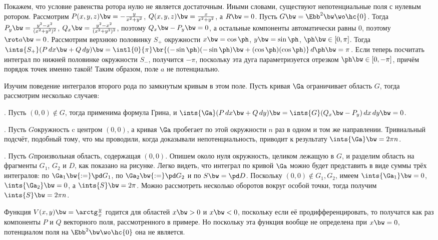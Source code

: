 \documentclass[a4paper]{article}
\begin{document}
\begin{ex}
Покажем, что условие равенства ротора нулю не является достаточным. Иными словами, существуют непотенциальные
поля с нулевым ротором. Рассмотрим $P(x,y,z) \bw= -\frac{y}{x^2+y^2}$, $Q(x,y,z) \bw= \frac{x}{x^2+y^2}$, а
$R \bw= 0$. Пусть $G \bw= \Ebb^2\bw\wo \hc{0}$. Тогда $P_y\bw=\frac{y^2-x^2}{(x^2+y^2)^2}$,
$Q_x\bw=\frac{y^2-x^2}{(x^2+y^2)^2}$, поэтому $Q_x\bw-P_y \bw= 0$, а остальные компоненты автоматически равны
$0$, поэтому $\rot a \bw= 0$. Рассмотрим верхнюю половинку $S_+$ окружности $x \bw= \cos \ph$, $y \bw= \sin
\ph$, $\ph \bw\in [0,\pi]$. Тогда $\ints{S_+}(P\,d x \bw+ Q\,d y) \bw= \intl{0}{\pi}\br{(-\sin\ph)(-\sin\ph)
\bw+ (\cos\ph)(\cos\ph)}\,d \ph \bw= \pi$. Если теперь посчитать интеграл по нижней половинке окружности
$S_-$, получится $-\pi$, поскольку эта дуга параметризуется отрезком $\ph \bw\in [0,-\pi]$, причём порядок
точек именно такой! Таким образом, поле $a$ не потенциально.

Изучим поведение интегралов второго рода по замкнутым кривым в этом поле. Пусть кривая $\Ga$ ограничивает область $G$,
тогда рассмотрим несколько случаев:

. Пусть $(0,0)\notin G$, тогда применима формула Грина, и $\ints{\Ga}(P\,d x \bw+ Q\,d y) \bw=
\ints{G}(Q_x\bw-P_y)\,dx \,dy \bw= 0$.

. Пусть $G$\т окружность c центром $(0,0)$, а кривая $\Ga$ пробегает по этой окружности $n$ раз в
одном и том же направлении. Тривиальный подсчёт, подобный тому, что мы проводили, когда доказывали
непотенциальность, приводит к результату $\ints{\Ga} \bw= 2\pi n$.

\vskip-5pt
\hangindent=-57mm
. Пусть $G$\т произвольная область, содержащая $(0,0)$. Опишем около нуля окружность, целиком
лежащую в $G$, и разделим область на фрагменты $G_1$, $G_2$ и $D$, как показано на рисунке.
Легко видеть, что интеграл по кривой $\Ga$ можно будет представить в виде суммы трёх интегралов:
по $\Ga_1 \bw{:=} \pd G_1$, по $\Ga_2 \bw{:=} \pd G_2$ и по $S \bw= \pd D$. Поскольку $(0,0) \notin G_1, G_2$,
имеем $\ints{\Ga_1} \bw= 0$, $\ints{\Ga_2} \bw= 0$, а $\ints{S} \bw= 2\pi$. Можно рассмотреть
несколько оборотов вокруг особой точки, тогда получим $\ints{S} \bw= 2\pi n$.
\end{ex}

\begin{note}
Функция $V(x,y) \bw= \arctg \frac yx$ годится для областей $x \bw> 0$ и $x \bw< 0$, поскольку если
её продифференцировать, то получатся как раз компоненты $P$ и $Q$ векторного поля, рассмотренного в
примере. Но поскольку эта функция вообще не определена при $x \bw= 0$, потенциалом поля
на $\Ebb^2 \bw\wo \hc{0}$ она не является.
\end{note}
\end{document}
